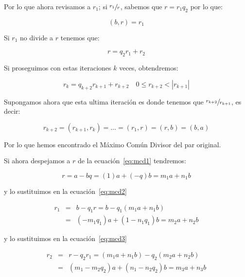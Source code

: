         Por lo que ahora revisamos a $r_1$; si $\sfrac{r_1}{r}$, sabemos que $r = r_1 q_2$ por lo que:

        \begin{equation*}
            (b, r) = r_1
        \end{equation*}

        Si $r_1$ no divide a $r$ tenemos que:

        \begin{equation} \label{eq:mcd3}
            r = q_2 r_1 + r_2
        \end{equation}

        Si proseguimos con estas iteraciones $k$ veces, obtendremos:

        \begin{equation*}
            r_k = q_{k+2} r_{k+1} + r_{k+2} \quad 0 \leq r_{k+2} < |r_{k+1}|
        \end{equation*}

        Supongamos ahora que esta ultima iteración es donde tenemos que $\sfrac{r_{k+2}}{r_{k+1}}$, es decir:

        \begin{equation*}
            r_{k+2} = (r_{k+1}, r_k) = \dots = (r_1, r) = (r, b) = (b, a)
        \end{equation*}

        Por lo que hemos encontrado el Máximo Común Divisor del par original.

        Si ahora despejamos a $r$ de la ecuación~\ref{eq:mcd1} tendremos:

        \begin{equation*}
            r = a - bq = (1)a + (-q)b = m_1 a + n_1 b
        \end{equation*}

        y lo sustituimos en la ecuación~\ref{eq:mcd2}

        \begin{eqnarray*}
            r_1 & = & b - q_1 r = b - q_1 (m_1 a + n_1 b) \\
            & = & (-m_1 q_1) a + (1 - n_1 q_1) b = m_2 a + n_2 b
        \end{eqnarray*}

        y lo sustituimos en la ecuación~\ref{eq:mcd3}

        \begin{eqnarray*}
            r_2 & = & r - q_2 r_1 = (m_1 a + n_1 b) - q_2 (m_2 a + n_2 b) \\
            & = & (m_1 - m_2 q_2) a + (n_1 - n_2 q_2) b = m_3 a + n_3 b
        \end{eqnarray*}

